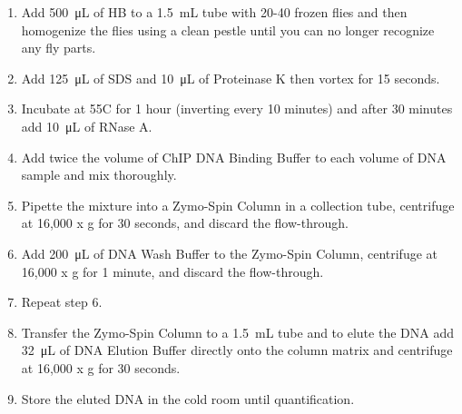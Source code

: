 \documentclass[a4paper,12pt]{article}
\begin{document}
\begin{enumerate}

\item Add \SI{500}{\micro\liter} of HB to a \SI{1.5}{\milli\liter} tube with 20-40 frozen flies and then homogenize the flies using a clean pestle until you can no longer recognize any fly parts.
\item Add \SI{125}{\micro\liter} of SDS and \SI{10}{\micro\liter} of Proteinase K then vortex for 15 seconds. 
\item Incubate at 55C for 1 hour (inverting every 10 minutes) and after 30 minutes add  \SI{10}{\micro\liter} of RNase A.  
\item Add twice the volume of ChIP DNA Binding Buffer to each volume of DNA sample and mix thoroughly.
\item Pipette the mixture into a Zymo-Spin Column in a collection tube, centrifuge at 16,000 x g for 30 seconds, and discard the flow-through. 
\item Add \SI{200}{\micro\liter} of DNA Wash Buffer to the Zymo-Spin Column, centrifuge at 16,000 x g for 1 minute, and discard the flow-through.
\item Repeat step 6.
\item Transfer the Zymo-Spin Column to a \SI{1.5}{\milli\liter} tube and to elute the DNA add \SI{32}{\micro\liter} of DNA Elution Buffer directly onto the column matrix and centrifuge at 16,000 x g for 30 seconds.
\item Store the eluted DNA in the cold room until quantification.  
\end{enumerate}
\end{document}
